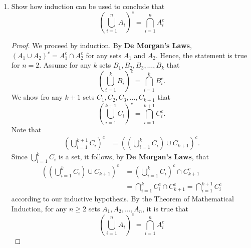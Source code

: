 \documentclass[12pt]{article}
\newenvironment{problem}[2][Problem]{\begin{trivlist}
		\item[\hskip \labelsep {\bfseries #1}\hskip \labelsep {\bfseries #2.}]}{\end{trivlist}}
\begin{document}
	\begin{problem}{1.2.13}
		\begin{enumerate}[label=(\alph*)]
			\item Show how induction can be used to conclude that
			\begin{equation*}
				\left(\bigcup_{i=1}^{n} A_{i}\right)^{c} = \bigcap_{i=1}^{n} A_{i}^{c}
			\end{equation*}
		\begin{proof}
			We proceed by induction. By \textbf{De Morgan's Laws}, $(A_{1}\cup A_{2})^{c} = A_{1}^{c}\cap A_{2}^{c}$ for any sets $A_{1}$ and $A_{2}$. Hence, the statement is true for $n=2$. Assume for any $k$ sets $B_{1},B_{2},B_{3},\ldots, B_{k}$ that 
			\begin{equation*}
				\left(\bigcup_{i=1}^{k} B_{i}\right)^{c} = \bigcap_{i=1}^{k} B_{i}^{c}.
			\end{equation*}
		We show fro any $k+1$ sets $C_{1},C_{2},C_{3},\ldots, C_{k+1}$ that 
			\begin{equation*}
				\left(\bigcup_{i=1}^{k+1} C_{i}\right)^{c} = \bigcap_{i=1}^{k+1} C_{i}^{c}.
			\end{equation*}
		Note that 
		\begin{align*}
			\left(\bigcup_{i=1}^{k+1} C_{i}\right)^{c} &= \left(\left(\bigcup_{i=1}^{k} C_{i}\right)\cup C_{k+1}\right)^{c}.
		\end{align*}
	Since $\bigcup_{i=1}^{k} C_{i}$ is a set, it follows, by \textbf{De Morgan's Laws}, that 
	\begin{align*}
		\left(\left(\bigcup_{i=1}^{k} C_{i}\right)\cup C_{k+1}\right)^{c} &= \left(\bigcup_{i=1}^{k} C_{i}\right)^{c}\cap C_{k+1}^{c}\\
		&= \bigcap_{i=1}^{k} C_{i}^{c} \cap C_{k+1}^{c} = \bigcap_{i=1}^{k+1} C_{i}^{c}
	\end{align*}
      according to our inductive hypothesis.
      By the Theorem of Mathematical Induction, for any $n\geq 2$ sets $A_{1},A_{2},\ldots,A_{n}$, it is true that
      \begin{equation*}
      	\left(\bigcup_{i=1}^{n} A_{i}\right)^{c} = \bigcap_{i=1}^{n} A_{i}^{c}
      \end{equation*}
		\end{proof}
		\end{enumerate}
	\end{problem}
\end{document}
